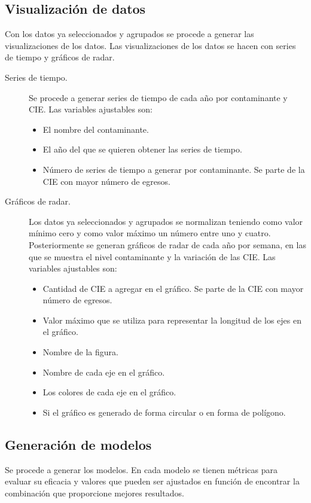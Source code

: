\subsection{Visualización de datos}
Con los datos ya seleccionados y agrupados se procede a generar las visualizaciones de los datos. Las visualizaciones de los datos se hacen con series de tiempo y gráficos de radar.

\begin{description}
\item [Series de tiempo.] {Se procede a generar series de tiempo de cada año por contaminante y CIE}. Las variables ajustables son:
\begin{itemize}
	\item El nombre del contaminante.
	\item El año del que se quieren obtener las series de tiempo.
	\item Número de series de tiempo a generar por contaminante. Se parte de la CIE con mayor número de egresos.
\end{itemize}

\item [Gráficos de radar.] {Los datos ya seleccionados y agrupados se normalizan teniendo como valor mínimo cero y como valor máximo un número entre uno y cuatro. Posteriormente se generan gráficos de radar de cada año por semana, en las que se muestra el nivel contaminante y la variación de las CIE}. Las variables ajustables son:
\begin{itemize}
    \item Cantidad de CIE a agregar en el gráfico. Se parte de la CIE con mayor número de egresos.
	\item Valor máximo que se utiliza para representar la longitud de los ejes en el gráfico.
	\item Nombre de la figura.
	\item Nombre de cada eje en el gráfico.
	\item Los colores de cada eje en el gráfico. 
	\item Si el gráfico es generado de forma circular o en forma de polígono.
\end{itemize}
\end{description}

\subsection{Generación de modelos}
Se procede a generar los modelos. En cada modelo se tienen métricas para evaluar su eficacia y valores que pueden ser ajustados en función de encontrar la combinación que proporcione mejores resultados.

